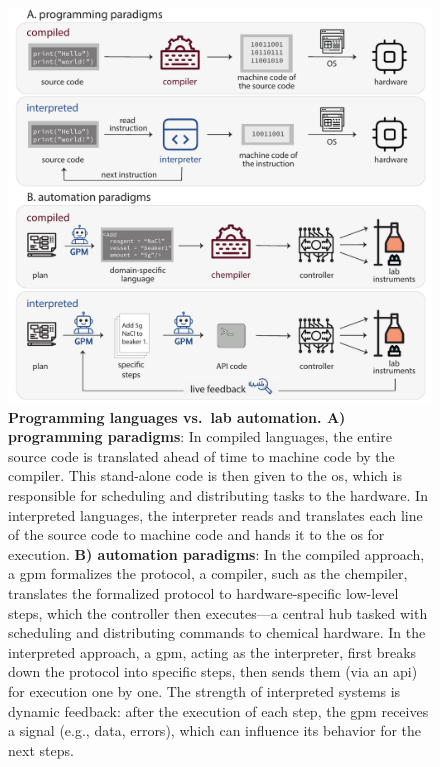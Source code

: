 \begin{figure}[p]
    \centering
\includegraphics[width=\textwidth]{figures/rescaled_figures/chemrev_figure15+16.pdf}
    \caption{\textbf{Programming languages vs.\ lab automation. A) programming paradigms}: In compiled languages, the entire source code is translated ahead of time to machine code by the compiler. This stand-alone code is then given to the \gls{os}, which is responsible for scheduling and distributing tasks to the hardware. In interpreted languages, the interpreter reads and translates each line of the source code to machine code and hands it to the \gls{os} for execution. \textbf{B) automation paradigms}: In the compiled approach, a \gls{gpm} formalizes the protocol, a compiler, such as the chempiler\autocite{steiner2019organic}, translates the formalized protocol to hardware-specific low-level steps, which the controller then executes---a central hub tasked with scheduling and distributing commands to chemical hardware. In the interpreted approach, a \gls{gpm}, acting as the interpreter, first breaks down the protocol into specific steps, then sends them (via an \gls{api}) for execution one by one. The strength of interpreted systems is dynamic feedback: after the execution of each step, the \gls{gpm} receives a signal (e.g., data, errors), which can influence its behavior for the next steps.}
    \label{fig:exec}
\end{figure}

